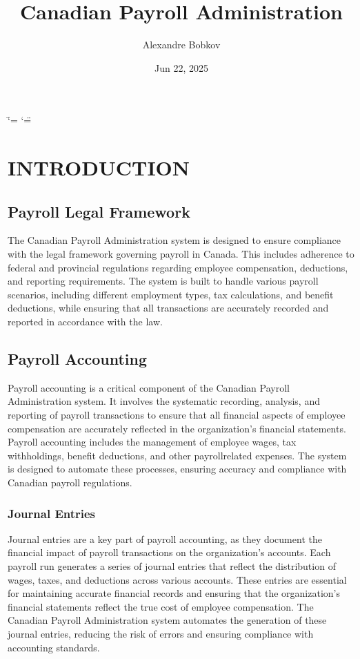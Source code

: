 \documentclass[letterpaper,10pt,english]{sphinxmanual}
\title{Canadian Payroll Administration}
\date{Jun 22, 2025}
\author{Alexandre Bobkov}
\begin{document}
\ifdefined\shorthandoff
  \ifnum\catcode`\=\string=\active\shorthandoff{=}\fi
  \ifnum\catcode`\"=\active{}\fi
\fi

\pagestyle{empty}
\sphinxmaketitle
\pagestyle{plain}
\sphinxtableofcontents
\pagestyle{normal}
\label{\detokenize{index::doc}}


\sphinxstepscope


\chapter{INTRODUCTION}
\label{\detokenize{introduction:introduction}}\label{\detokenize{introduction::doc}}

\section{Payroll Legal Framework}
\label{\detokenize{introduction:payroll-legal-framework}}
\sphinxAtStartPar
The Canadian Payroll Administration system is designed to ensure compliance with the legal framework governing payroll in Canada. This includes adherence to federal and provincial regulations regarding employee compensation, deductions, and reporting requirements.
The system is built to handle various payroll scenarios, including different employment types, tax calculations, and benefit deductions, while ensuring that all transactions are accurately recorded and reported in accordance with the law.


\section{Payroll Accounting}
\label{\detokenize{introduction:payroll-accounting}}
\sphinxAtStartPar
Payroll accounting is a critical component of the Canadian Payroll Administration system. It involves the systematic recording, analysis, and reporting of payroll transactions to ensure that all financial aspects of employee compensation are accurately reflected in the organization’s financial statements.
Payroll accounting includes the management of employee wages, tax withholdings, benefit deductions, and other payroll\sphinxhyphen{}related expenses. The system is designed to automate these processes, ensuring accuracy and compliance with Canadian payroll regulations.


\subsection{Journal Entries}
\label{\detokenize{introduction:journal-entries}}
\sphinxAtStartPar
Journal entries are a key part of payroll accounting, as they document the financial impact of payroll transactions on the organization’s accounts. Each payroll run generates a series of journal entries that reflect the distribution of wages, taxes, and deductions across various accounts.
These entries are essential for maintaining accurate financial records and ensuring that the organization’s financial statements reflect the true cost of employee compensation. The Canadian Payroll Administration system automates the generation of these journal entries, reducing the risk of errors and ensuring compliance with accounting standards.
\end{document}
